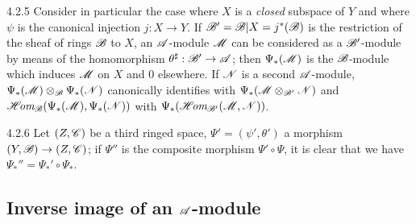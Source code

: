 \begin{env}{4.2.5}
\label{env-0.4.2.5}
Consider in particular the case where $X$ is a \emph{closed} subspace of $Y$ and
where $\psi$ is the canonical injection $j:X\to Y$. If
$\mathscr{B}'=\mathscr{B}|X=j^*(\mathscr{B})$ is the restriction of the sheaf of rings $\mathscr{B}$
to $X$, an $\mathscr{A}$-module $\mathscr{M}$ can be considered as a $\mathscr{B}'$-module by
means of the homomorphism $\theta^\sharp:\mathscr{B}'\to\mathscr{A}$; then
$\Psi_*(\mathscr{M})$ is the $\mathscr{B}$-module which induces $\mathscr{M}$ on $X$ and $0$
elsewhere. If $\mathscr{N}$ is a second $\mathscr{A}$-module,
$\Psi_*(\mathscr{M})\otimes_\mathscr{B}\Psi_*(\mathscr{N})$ canonically identifies with
$\Psi_*(\mathscr{M}\otimes_{\mathscr{B}'}\mathscr{N})$ and
$\mathscr{H}\!\textit{om}_\mathscr{B}(\Psi_*(\mathscr{M}),\Psi_*(\mathscr{N}))$ with
$\Psi_*(\mathscr{H}\!\textit{om}_{\mathscr{B}'}(\mathscr{M},\mathscr{N}))$.
\end{env}

\begin{env}{4.2.6}
\label{env-0.4.2.6}
Let $(Z,\mathscr{C})$ be a third ringed space, $\Psi'=(\psi',\theta')$ a morphism
$(Y,\mathscr{B})\to(Z,\mathscr{C})$; if $\Psi''$ is the composite morphism
$\Psi'\circ\Psi$, it is clear that we have $\Psi_*''=\Psi_*'\circ\Psi_*$.
\end{env}

\subsection{Inverse image of an $\mathscr{A}$-module}
\label{0-prelim-4.3}

